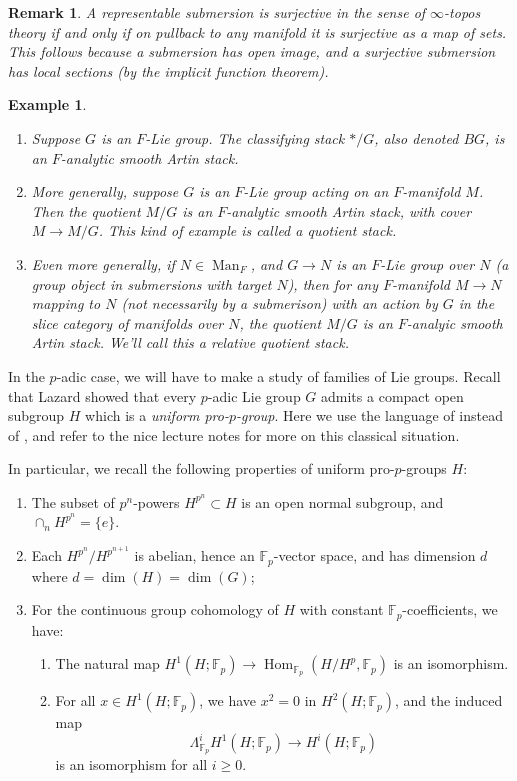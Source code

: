 \documentclass[12pt]{article}
\newtheorem{example}[theorem]{Example}
\newtheorem{remark}[theorem]{Remark}
\newcommand{\on}{\operatorname}
\newcommand{\mbb}{\mathbb}
\begin{document}
\begin{remark}
A representable submersion is surjective in the sense of $\infty$-topos theory if and only if on pullback to any manifold it is surjective as a map of sets.  This follows because a submersion has open image, and a surjective submersion has local sections (by the implicit function theorem).
\end{remark}

\begin{example}
\begin{enumerate}
\item Suppose $G$ is an $F$-Lie group.  The \emph{classifying stack} $\ast/G$, also denoted $BG$, is an $F$-analytic smooth Artin stack.
\item More generally, suppose $G$ is an $F$-Lie group acting on an $F$-manifold $M$.  Then the quotient $M/G$ is an $F$-analytic smooth Artin stack, with cover $M\to M/G$.  This kind of example is called a \emph{quotient stack}.
\item Even more generally, if $N\in\on{Man}_F$, and $G\to N$ is an $F$-Lie group over $N$ (a group object in submersions with target $N$), then for any $F$-manifold $M\to N$ mapping to $N$ (not necessarily by a submerison) with an action by $G$ in the slice category of manifolds over $N$, the quotient $M/G$ is an $F$-analyic smooth Artin stack.  We'll call this a \emph{relative quotient stack}.
\end{enumerate}
\end{example}


In the $p$-adic case, we will have to make a study of families of Lie groups.  Recall that Lazard showed that every $p$-adic Lie group $G$ admits a compact open subgroup $H$ which is a \emph{uniform pro-$p$-group}.  Here we use the language of \cite{DixonAnalytic} instead of \cite{LazardGroupes}, and refer to the nice lecture notes \cite{Pstragowski} for more on this classical situation.

In particular, we recall the following properties of uniform pro-$p$-groups $H$:\label{scholiumuniform}
\begin{enumerate}
\item The subset of $p^n$-powers $H^{p^n}\subset H$ is an open normal subgroup, and $\cap_n H^{p^n}=\{e\}$.
\item Each $H^{p^n}/H^{p^{n+1}}$ is abelian, hence an $\mathbb{F}_p$-vector space, and has dimension $d$ where $d=\on{dim}(H)=\on{dim}(G)$;
\item For the continuous group cohomology of $H$ with constant $\mathbb{F}_p$-coefficients, we have:
\begin{enumerate}
\item The natural map $H^1(H;\mbb{F}_p)\to \on{Hom}_{\mbb{F}_p}(H/H^p,\mbb{F}_p)$ is an isomorphism.
\item For all $x\in H^1(H;\mbb{F}_p)$, we have $x^2=0$ in $H^2(H;\mbb{F}_p)$, and the induced map
$$\Lambda^i_{\mbb{F}_p}H^1(H;\mbb{F}_p)\to H^i(H;\mbb{F}_p)$$
is an isomorphism for all $i\geq 0$.
\end{enumerate}
\end{enumerate}
\end{document}
